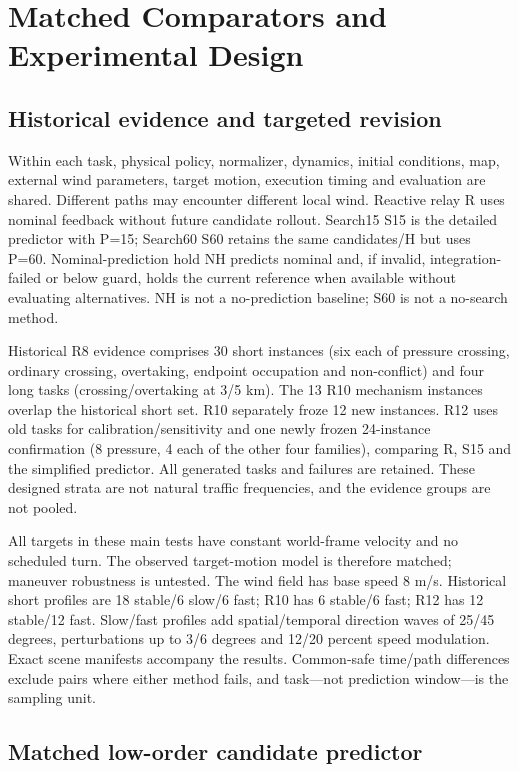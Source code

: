 \documentclass[conference]{IEEEtran}
\begin{document}
\section{Matched Comparators and Experimental Design}

\subsection{Historical evidence and targeted revision}

Within each task, physical policy, normalizer, dynamics, initial conditions, map, external wind parameters, target motion, execution timing and evaluation are shared. Different paths may encounter different local wind. Reactive relay R uses nominal feedback without future candidate rollout. Search15 S15 is the detailed predictor with P=15; Search60 S60 retains the same candidates/H but uses P=60. Nominal-prediction hold NH predicts nominal and, if invalid, integration-failed or below guard, holds the current reference when available without evaluating alternatives. NH is not a no-prediction baseline; S60 is not a no-search method.

Historical R8 evidence comprises 30 short instances (six each of pressure crossing, ordinary crossing, overtaking, endpoint occupation and non-conflict) and four long tasks (crossing/overtaking at 3/5 km). The 13 R10 mechanism instances overlap the historical short set. R10 separately froze 12 new instances. R12 uses old tasks for calibration/sensitivity and one newly frozen 24-instance confirmation (8 pressure, 4 each of the other four families), comparing R, S15 and the simplified predictor. All generated tasks and failures are retained. These designed strata are not natural traffic frequencies, and the evidence groups are not pooled.

All targets in these main tests have constant world-frame velocity and no scheduled turn. The observed target-motion model is therefore matched; maneuver robustness is untested. The wind field has base speed 8 m/s. Historical short profiles are 18 stable/6 slow/6 fast; R10 has 6 stable/6 fast; R12 has 12 stable/12 fast. Slow/fast profiles add spatial/temporal direction waves of 25/45 degrees, perturbations up to 3/6 degrees and 12/20 percent speed modulation. Exact scene manifests accompany the results. Common-safe time/path differences exclude pairs where either method fails, and task---not prediction window---is the sampling unit.

\subsection{Matched low-order candidate predictor}
\end{document}

